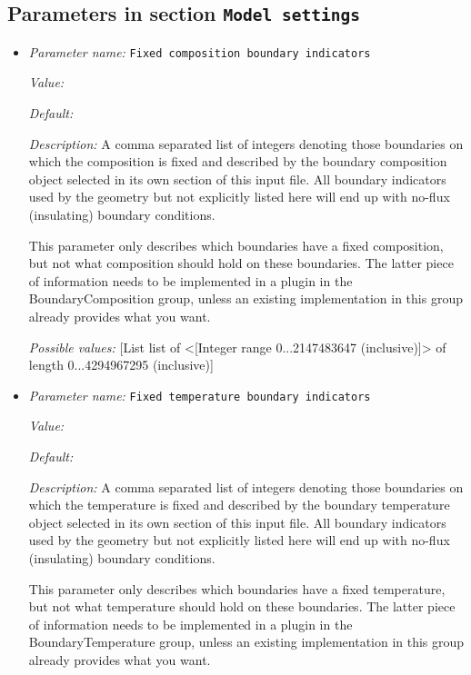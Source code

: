 \subsection{Parameters in section \tt Model settings}
\label{parameters:Model_20settings}

\begin{itemize}
\item {\it Parameter name:} {\tt Fixed composition boundary indicators}


{\it Value:} 


{\it Default:} 


{\it Description:} A comma separated list of integers denoting those boundaries on which the composition is fixed and described by the boundary composition object selected in its own section of this input file. All boundary indicators used by the geometry but not explicitly listed here will end up with no-flux (insulating) boundary conditions.

This parameter only describes which boundaries have a fixed composition, but not what composition should hold on these boundaries. The latter piece of information needs to be implemented in a plugin in the BoundaryComposition group, unless an existing implementation in this group already provides what you want.


{\it Possible values:} [List list of <[Integer range 0...2147483647 (inclusive)]> of length 0...4294967295 (inclusive)]
\item {\it Parameter name:} {\tt Fixed temperature boundary indicators}


{\it Value:} 


{\it Default:} 


{\it Description:} A comma separated list of integers denoting those boundaries on which the temperature is fixed and described by the boundary temperature object selected in its own section of this input file. All boundary indicators used by the geometry but not explicitly listed here will end up with no-flux (insulating) boundary conditions.

This parameter only describes which boundaries have a fixed temperature, but not what temperature should hold on these boundaries. The latter piece of information needs to be implemented in a plugin in the BoundaryTemperature group, unless an existing implementation in this group already provides what you want.



\end{itemize}
